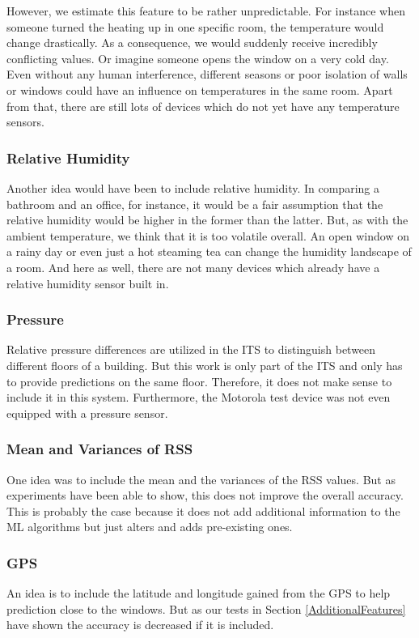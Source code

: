 However, we estimate this feature to be rather unpredictable. For instance when someone turned the heating up in one specific room, the temperature would change drastically. As a consequence, we would suddenly receive incredibly conflicting values. Or imagine someone opens the window on a very cold day. Even without any human interference, different seasons or poor isolation of walls or windows could have an influence on temperatures in the same room.
Apart from that, there are still lots of devices which do not yet have any temperature sensors.

\subsubsection{Relative Humidity}
Another idea would have been to include relative humidity. In comparing a bathroom and an office, for instance, it would be a fair assumption that the relative humidity would be higher in the former than the latter.
But, as with the ambient temperature, we think that it is too volatile overall. An open window on a rainy day or even just a hot steaming tea can change the humidity landscape of a room. And here as well, there are not many devices which already have a relative humidity sensor built in.


\subsubsection{Pressure}
Relative pressure differences are utilized in the ITS to distinguish between different floors of a building. But this work is only part of the ITS and only has to provide predictions on the same floor. Therefore, it does not make sense to include it in this system. Furthermore, the Motorola test device was not even equipped with a pressure sensor.

\subsubsection{Mean and Variances of RSS}
\label{sec:MeanAndVariances}
One idea was to include the mean and the variances of the RSS values. But as experiments have been able to show, this does not improve the overall accuracy. This is probably the case because it does not add additional information to the ML algorithms but just alters and adds pre-existing ones.


\subsubsection{GPS}
An idea is to include the latitude and longitude gained from the GPS to help prediction close to the windows. But as our tests in Section \ref{AdditionalFeatures} have shown the accuracy is decreased if it is included.


